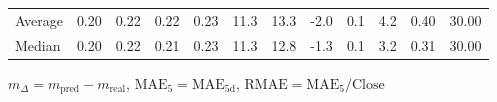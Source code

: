 \begin{threeparttable}
{\begin{tabular}{lrrrrrrrrrrr}
Average &          0.20 &          0.22 &          0.22 &        0.23 &                11.3 &                13.3 &       -2.0 &                 0.1 &              4.2 &            0.40 &                  30.00 \\
 Median &          0.20 &          0.22 &          0.21 &        0.23 &                11.3 &                12.8 &       -1.3 &                 0.1 &              3.2 &            0.31 &                  30.00 \\
\bottomrule
\end{tabular}
}
\begin{tablenotes}\footnotesize
\item $m_\Delta=m_{\text{pred}}-m_{\text{real}}$,
$\mathrm{MAE}_5=\mathrm{MAE}_{5\text{d}}$,
$\mathrm{RMAE}=\mathrm{MAE}_5/\text{Close}$
\end{tablenotes}
\end{threeparttable}
\endgroup

